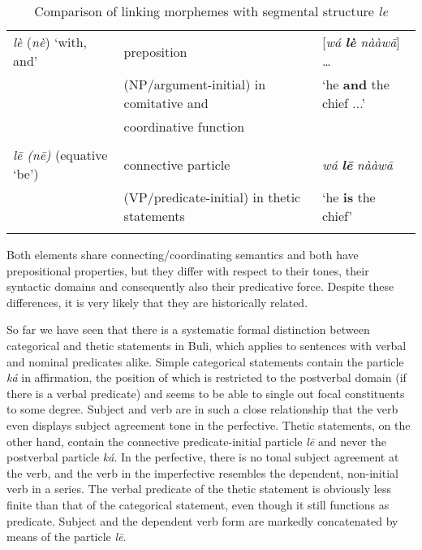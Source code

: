 \documentclass[output=paper]{langsci/langscibook}
\begin{document}
\begin{table}
\caption{Comparison of linking morphemes with segmental structure \textit{le}}
\label{tab:3}


\begin{tabularx}{\textwidth}{XXX}
\lsptoprule

{\textit{lè} (\textit{nè})} {‘with, and’} & {preposition} & { [\textit{wá} \textbf{\textit{lè} }\textit{ nààw\={a}}] …} \\ 
& {(NP/argument-initial) in comitative and } & {‘he \textbf{and} the chief ...’}\\
& {coordinative function}
\\ \\
{\textit{l\={e} (n\={e})}} {(equative ‘be’)} & {connective particle } & {\textit{wá} \textbf{\textit{l\={e}}}\textit{ nààw\={a}}} \\
& {(VP/predicate-initial) in thetic statements} & {‘he \textbf{is} the chief’}\\
\lspbottomrule
\end{tabularx}
\end{table}

Both elements share connecting/coordinating semantics and both have prepositional properties, but they differ with respect to their tones, their syntactic domains and consequently also their predicative force. Despite these differences, it is very likely that they are historically related.

So far we have seen that there is a systematic formal distinction between categorical and thetic statements in Buli, which applies to sentences with verbal and nominal predicates alike. Simple categorical statements contain the particle \textit{ká} in affirmation, the position of which is restricted to the postverbal domain (if there is a verbal predicate) and seems to be able to single out focal constituents to some degree. Subject and verb are in such a close relationship that the verb even displays subject agreement tone in the perfective. Thetic statements, on the other hand, contain the connective predicate-initial particle \textit{l\={e}} and never the postverbal particle \textit{ká}. In the perfective, there is no tonal subject agreement at the verb, and the verb in the imperfective resembles the dependent, non-initial verb in a series. The verbal predicate of the thetic statement is obviously less finite than that of the categorical statement, even though it still functions as predicate. Subject and the dependent verb form are markedly concatenated by means of the particle \textit{l\={e}}.
\end{document}
